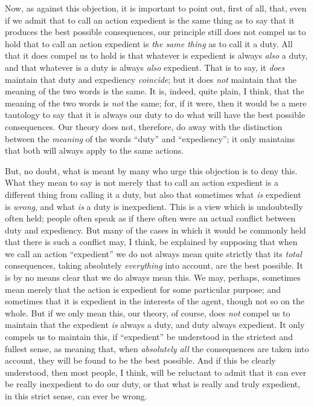 Now, as against this objection, it is important to point out, first of
all, that, even if we admit that to call an action expedient is the
same thing as to say that it produces the best possible consequences,
our principle still does not compel us to hold that to call an action
expedient is \textit{the same thing} as to call it a duty. All that it
does compel us to hold is that whatever is expedient is always
\textit{also} a duty, and that whatever is a duty is always
\textit{also} expedient. That is to say, it \textit{does} maintain
that duty and expediency \textit{coincide}; but it does \textit{not}
 maintain that the meaning of the two words is the same. It
is, indeed, quite plain, I think, that the meaning of the two words is
\textit{not} the same; for, if it were, then it would be a mere
tautology to say that it is always our duty to do what will have the
best possible consequences. Our theory does not, therefore, do away
with the distinction between the \textit{meaning} of the words
``duty'' and ``expediency''; it only maintains that both will always
apply to the same actions.

But, no doubt, what is meant by many who urge this objection is to
deny this. What they mean to say is not merely that to call an action
expedient is a different thing from calling it a duty, but also that
sometimes what \textit{is} expedient is \textit{wrong}, and what
\textit{is} a duty is inexpedient. This is a view which is undoubtedly
often held; people often speak as if there often were an actual
conflict between duty and expediency. But many of the cases in which
it would be commonly held that there is such a conflict may, I think,
be explained by supposing that when we call an action ``expedient'' we
do not always mean quite strictly that  its \textit{total}
consequences, taking absolutely \textit{everything} into account, are
the best possible. It is by no means clear that we do always mean
this. We may, perhaps, sometimes mean merely that the action is
expedient for some particular purpose; and sometimes that it is
expedient in the interests of the agent, though not so on the whole.
But if we only mean this, our theory, of course, does \textit{not}
compel us to maintain that the expedient \textit{is} always a duty,
and duty always expedient. It only compels us to maintain this, if
``expedient'' be understood in the strictest and fullest sense, as
meaning that, when \textit{absolutely all} the consequences are taken
into account, they will be found to be the best possible. And if this
be clearly understood, then most people, I think, will be reluctant to
admit that it can ever be really inexpedient to do our duty, or that
what is really and truly expedient, in this strict sense, can ever be
wrong.

